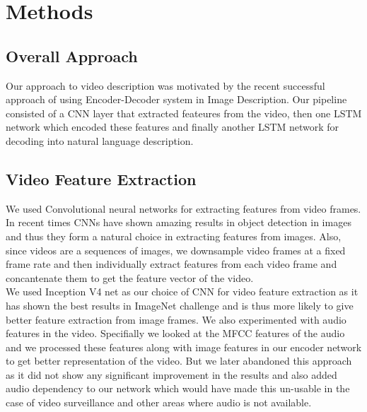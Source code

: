 \documentclass[12pt]{article}
\begin{document}
\section{Methods}
\subsection{Overall Approach}
	Our approach to video description was motivated by the recent successful approach of using Encoder-Decoder system in Image Description.
	Our pipeline consisted of a CNN layer that extracted feateures from the video, then one LSTM network which encoded these features and finally
	another LSTM network for decoding into natural language description.

\subsection{Video Feature Extraction}

	We used Convolutional neural networks for extracting features from video frames. In recent times CNNs have shown amazing results in object
	detection in images and thus they form a natural choice in extracting features from images. Also, since videos are a sequences of images, we
	downsample video frames at a fixed frame rate and then individually extract features from each video frame and concantenate them to get 
	the feature vector of the video.\\
	We used Inception V4 net as our choice of CNN for video feature extraction as it has shown the best results in ImageNet challenge and is thus
	more likely to give better feature extraction from image frames. We also experimented with audio features in the video. Specifially we looked
	at the MFCC features of the audio and we processed these features along with image features in our encoder network to get better representation
	of the video. But we later abandoned this approach as it did not show any significant improvement in the results and also added audio dependency
	to our network which would have made this un-usable in the case of video surveillance and other areas where audio is not available.
	
\end{document}
